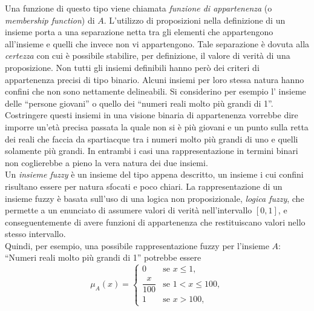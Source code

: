 \documentclass [11pt,a4paper,twoside,openright] {book}
\begin{document}
Una funzione di questo tipo viene chiamata \textit{funzione di appartenenza} (o \textit{membership function}) di $A$. L'utilizzo di proposizioni nella definizione di un insieme porta a una separazione netta tra gli elementi che appartengono all'insieme e quelli che invece non vi appartengono. Tale separazione è dovuta alla \textit{certezza} con cui è possibile stabilire, per definizione, il valore di verità di una proposizione. Non tutti gli insiemi definibili hanno però dei criteri di appartenenza precisi di tipo binario. Alcuni insiemi per loro stessa natura hanno confini che non sono nettamente delineabili. Si considerino per esempio l' insieme delle ``persone giovani'' o quello dei ``numeri reali molto più grandi di 1''. Costringere questi insiemi in una visione binaria di appartenenza vorrebbe dire imporre un'età precisa passata la quale non si è più giovani e un punto sulla retta dei reali che faccia da spartiacque tra i numeri molto più grandi di uno e quelli solamente più grandi. In entrambi i casi una rappresentazione in termini binari non coglierebbe a pieno la vera natura dei due insiemi.\\
Un \textit{insieme fuzzy} è un insieme del tipo appena descritto, un insieme i cui confini risultano essere per natura sfocati e poco chiari. La rappresentazione di un insieme fuzzy è basata sull'uso di una logica non proposizionale, \textit{logica fuzzy}, che permette a un enunciato di assumere valori di verità nell'intervallo $[0, 1]$, e conseguentemente di avere funzioni di appartenenza che restituiscano valori nello stesso intervallo.\\
Quindi, per esempio, una possibile rappresentazione fuzzy per l'insieme $A$: ``Numeri reali molto più grandi di 1'' potrebbe essere
\begin{equation}
\mu_{A}(x)=
\begin{cases}
0 & \text{se } x \leq 1 ,\\
\dfrac{x}{100} & \text{se }1 <  x \leq 100 ,\\
1 & \text{se } x > 100,
\end{cases}
\end{equation}
\end{document}
